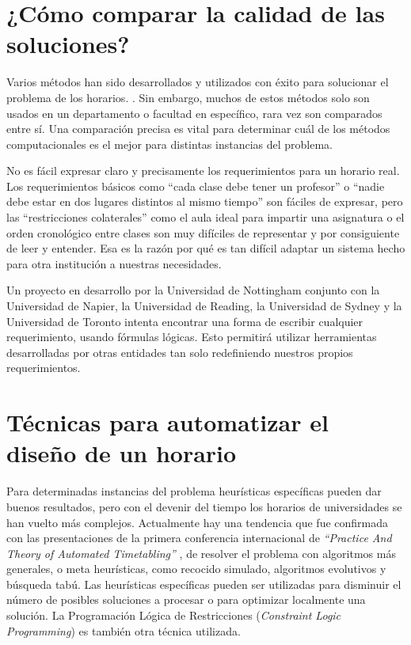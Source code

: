 \section{¿Cómo comparar la calidad de las soluciones?}

Varios métodos han sido desarrollados y utilizados con éxito para solucionar el problema de los horarios.
\cite{VA Bardadym, MW Carter, MW Carter and G Laporte, JH Kingston}. Sin embargo, muchos de estos métodos 
solo son usados en un departamento o facultad en específico, rara vez son comparados entre sí. Una 
comparación precisa es vital para determinar cuál de los métodos computacionales es el mejor para
distintas instancias del problema.

No es fácil expresar claro y precisamente los requerimientos para un horario real. Los requerimientos básicos
como ``cada clase debe tener un profesor'' o ``nadie debe estar en dos lugares distintos al mismo tiempo'' son
fáciles de expresar, pero las ``restricciones colaterales'' como el aula ideal para impartir una asignatura o
el orden cronológico entre clases son muy difíciles de representar y por consiguiente de leer y entender. Esa
es la razón por qué es tan difícil adaptar un sistema hecho para otra institución a nuestras necesidades.

Un proyecto en desarrollo por la Universidad de Nottingham conjunto con la Universidad de Napier, la Universidad
de Reading, la Universidad de Sydney y la Universidad de Toronto intenta encontrar una forma de escribir cualquier
requerimiento, usando fórmulas lógicas. Esto permitirá utilizar herramientas desarrolladas por otras entidades tan
solo redefiniendo nuestros propios requerimientos.

\section{Técnicas para automatizar el diseño de un horario}

Para determinadas instancias del problema heurísticas específicas pueden dar buenos resultados, pero con el devenir del tiempo los horarios de universidades se han vuelto más complejos. Actualmente hay una tendencia que fue confirmada
con las presentaciones de la primera conferencia internacional de \emph{``Practice And Theory of Automated Timetabling''}
\cite{D Abramson and J Abela}, de resolver el problema con algoritmos más generales, o meta heurísticas, como
recocido simulado, algoritmos evolutivos y búsqueda tabú. Las heurísticas específicas pueden ser utilizadas
para disminuir el número de posibles soluciones a procesar o para optimizar localmente una solución. La Programación
Lógica de Restricciones (\emph{Constraint Logic Programming}) es también otra técnica utilizada.

